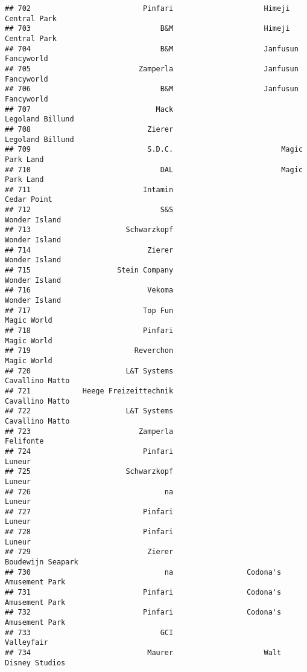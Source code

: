\documentclass[
]{article}
\begin{document}
\begin{verbatim}
## 702                          Pinfari                     Himeji Central Park
## 703                              B&M                     Himeji Central Park
## 704                              B&M                     Janfusun Fancyworld
## 705                         Zamperla                     Janfusun Fancyworld
## 706                              B&M                     Janfusun Fancyworld
## 707                             Mack                        Legoland Billund
## 708                           Zierer                        Legoland Billund
## 709                           S.D.C.                         Magic Park Land
## 710                              DAL                         Magic Park Land
## 711                          Intamin                             Cedar Point
## 712                              S&S                           Wonder Island
## 713                      Schwarzkopf                           Wonder Island
## 714                           Zierer                           Wonder Island
## 715                    Stein Company                           Wonder Island
## 716                           Vekoma                           Wonder Island
## 717                          Top Fun                             Magic World
## 718                          Pinfari                             Magic World
## 719                        Reverchon                             Magic World
## 720                      L&T Systems                         Cavallino Matto
## 721            Heege Freizeittechnik                         Cavallino Matto
## 722                      L&T Systems                         Cavallino Matto
## 723                         Zamperla                               Felifonte
## 724                          Pinfari                                  Luneur
## 725                      Schwarzkopf                                  Luneur
## 726                               na                                  Luneur
## 727                          Pinfari                                  Luneur
## 728                          Pinfari                                  Luneur
## 729                           Zierer                       Boudewijn Seapark
## 730                               na                 Codona's Amusement Park
## 731                          Pinfari                 Codona's Amusement Park
## 732                          Pinfari                 Codona's Amusement Park
## 733                              GCI                              Valleyfair
## 734                           Maurer                     Walt Disney Studios

\end{verbatim}
\end{document}
